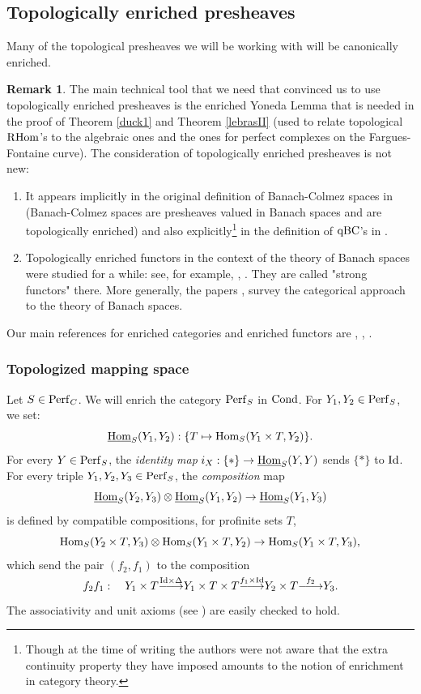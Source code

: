 \documentclass[10pt]{amsart}
\theoremstyle{definition}
\newtheorem{remark}[equation]{Remark}
\theoremstyle{remark}
\def\lomapr#1{\smash{\mathop{\relbar\joinrel\longrightarrow}\limits^{#1}}}
\newcommand{\Hom}{{\rm{Hom}} }
\newcommand{\uHom}{\underline{{\rm{Hom}} }}
\numberwithin{equation}{section}
\def\R{{\mathrm R}}
\numberwithin{equation}{section}
\begin{document}
\subsection{Topologically enriched  presheaves}\label{ias1}
Many of the topological presheaves    we will be working with will be canonically
 enriched.  
 \begin{remark} The main technical tool that we need that convinced us to use topologically enriched presheaves is the enriched Yoneda Lemma that is needed in the proof of Theorem \ref{duck1} and Theorem \ref{lebrasII}  (used to  relate topological $\R\Hom$'s to the algebraic ones and the ones for perfect complexes on the Fargues-Fontaine curve). The consideration of topologically enriched presheaves  is not new:
 \begin{enumerate}
 \item It appears implicitly in the original definition of Banach-Colmez spaces in  \cite{CF} (Banach-Colmez spaces are presheaves valued in Banach spaces and are topologically enriched) and also explicitly\footnote{Though at the time of writing \cite{CN5} the authors were not aware that the extra continuity property they have imposed amounts to the notion of enrichment in category theory.}  in the definition of ${\rm qBC}$'s in \cite{CN5}. 
 
 \item Topologically enriched functors in the context of the theory of Banach spaces were studied for a while: see, for example, \cite{HP}, \cite{Pel}. They are called "strong functors" there. More generally, the papers \cite{Cas1}, \cite{Cas2} survey the categorical approach to the theory of Banach spaces. 
 \end{enumerate}
\end{remark}

 Our main references for enriched categories and enriched functors  are   \cite{Kelly}, \cite{GM}, \cite[App. C]{HM}.
 
  \subsubsection{Topologized mapping space} Let $S\in {\rm Perf}_C$. We will enrich the category ${\rm Perf}_S$ in ${\rm Cond}$.  For $Y_1, Y_2\in{\rm Perf}_S$, we set: 
$$
\uHom_S(Y_1,Y_2): \{T\mapsto \Hom_S(Y_1\times T,Y_2)\}.
$$ For every $Y\in {\rm Perf}_S$, the {\em identity map}  $i_X:\{*\}\to \uHom_S(Y,Y)$ sends $\{*\}$ to ${\rm Id}$. For every triple $Y_1,Y_2,Y_3\in {\rm Perf}_S$, the {\em composition} map
$$
\uHom_S(Y_2,Y_3)\otimes \uHom_S(Y_1,Y_2)\to \uHom_S(Y_1,Y_3)
$$
is defined by compatible compositions, for  profinite sets $T$, 
$$
\Hom_S(Y_2\times T,Y_3)\otimes \Hom_S(Y_1\times T,Y_2)\to \Hom_S(Y_1\times T,Y_3),
$$
which send the pair $(f_2,f_1)$ to the composition 
$$
f_2f_1:\quad Y_1\times T\lomapr{{\rm Id}\times \Delta} Y_1\times T\times T\lomapr{f_1\times{\rm Id} }Y_2\times T\lomapr{f_2}Y_3.
$$
The associativity and unit axioms (see \cite[(1.3), (1.4)]{Kelly}) are easily checked to hold.
\end{document}
